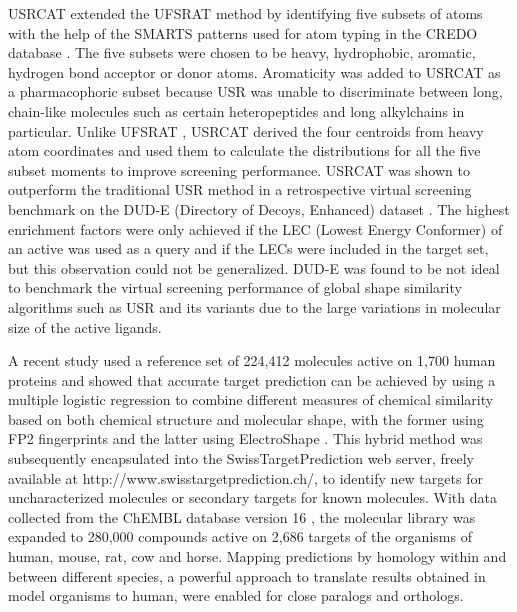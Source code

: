 \documentclass[a4,center,fleqn]{NAR}
\begin{document}
USRCAT \cite{1331} extended the UFSRAT \cite{1436} method by identifying five subsets of atoms with the help of the SMARTS patterns used for atom typing in the CREDO database \cite{522,1530}. The five subsets were chosen to be heavy, hydrophobic, aromatic, hydrogen bond acceptor or donor atoms. Aromaticity was added to USRCAT as a pharmacophoric subset because USR was unable to discriminate between long, chain-like molecules such as certain heteropeptides and long alkylchains in particular. Unlike UFSRAT \cite{1436}, USRCAT \cite{1331} derived the four centroids from heavy atom coordinates and used them to calculate the distributions for all the five subset moments to improve screening performance. USRCAT was shown to outperform the traditional USR method in a retrospective virtual screening benchmark on the DUD-E (Directory of Decoys, Enhanced) dataset \cite{1185}. The highest enrichment factors were only achieved if the LEC (Lowest Energy Conformer) of an active was used as a query and if the LECs were included in the target set, but this observation could not be generalized. DUD-E was found to be not ideal to benchmark the virtual screening performance of global shape similarity algorithms such as USR and its variants due to the large variations in molecular size of the active ligands.

A recent study \cite{1407} used a reference set of 224,412 molecules active on 1,700 human proteins and showed that accurate target prediction can be achieved by using a multiple logistic regression to combine different measures of chemical similarity based on both chemical structure and molecular shape, with the former using FP2 fingerprints and the latter using ElectroShape \cite{1338}. This hybrid method was subsequently encapsulated into the SwissTargetPrediction \cite{1408} web server, freely available at http://www.swisstargetprediction.ch/, to identify new targets for uncharacterized molecules or secondary targets for known molecules. With data collected from the ChEMBL database version 16 \cite{1441}, the molecular library was expanded to 280,000 compounds active on 2,686 targets of the organisms of human, mouse, rat, cow and horse. Mapping predictions by homology within and between different species, a powerful approach to translate results obtained in model organisms to human, were enabled for close paralogs and orthologs.
\end{document}

